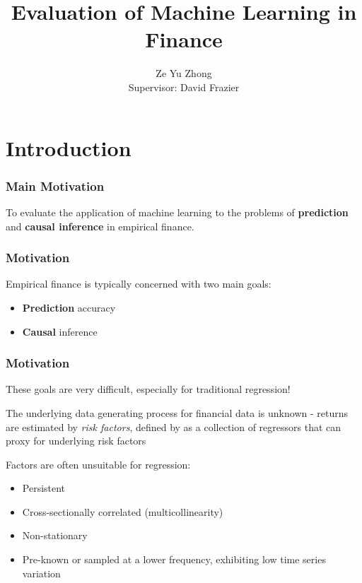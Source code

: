 \documentclass[aspectratio=169]{beamer}
\title{Evaluation of Machine Learning in Finance}
\author{Ze Yu Zhong 
	\\ Supervisor: David Frazier}
\institute{Monash University}
\date{}
\begin{document}
	
\begin{frame}[plain]
    \maketitle
\end{frame}

\section{Introduction}


\begin{frame}
\frametitle{Main Motivation}
To evaluate the application of machine learning to the problems of \textbf{prediction} and \textbf{causal inference} in empirical finance.
\end{frame}

\begin{frame}
\frametitle{Motivation}
Empirical finance is typically concerned with two main goals:
\begin{itemize}
	\item \textbf{Prediction} accuracy
	\item \textbf{Causal} inference
\end{itemize}
\end{frame}

\begin{frame}
\frametitle{Motivation}
These goals are very difficult, especially for traditional regression!

The underlying data generating process for financial data is unknown - returns are estimated by \textit{risk factors}, defined by \cite{harvey__2016} as a collection of regressors that can proxy for underlying risk factors

Factors are often unsuitable for regression:
\begin{itemize}
	\item Persistent
	\item Cross-sectionally correlated (multicollinearity)
	\item Non-stationary
	\item Pre-known or sampled at a lower frequency, exhibiting low time series variation
\end{itemize}
\end{frame}
\end{document}
